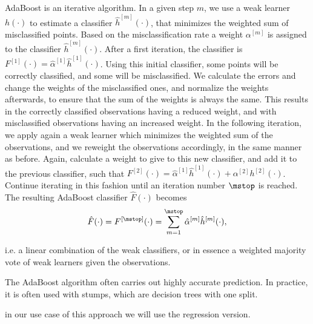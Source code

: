 AdaBoost \cite{adaboost}is an iterative algorithm.
In a given step $m$, we use a weak learner $h(\cdot)$ to estimate a classifier $\hat{h}^{[m]}(\cdot)$, that minimizes the weighted sum of misclassified points.
Based on the misclassification rate a weight $\alpha^{[m]}$ is assigned to the classifier $\hat{h}^{[m]}(\cdot)$.
After a first iteration, the classifier is $F^{[1]}(\cdot)=\hat{\alpha}^{[1]}\hat{h}^{[1]}(\cdot)$.
Using this initial classifier, some points will be correctly classified, and some will be misclassified.
We calculate the errors and change the weights of the misclassified ones, and normalize the weights afterwards, to ensure that the sum of the weights is always the same.
This results in the correctly classified observations having a reduced weight, and with misclassified observations having an increased weight.
In the following iteration, we apply again a weak learner which minimizes the weighted sum of the observations, and we reweight the observations accordingly, in the same manner as before.
Again, calculate a weight to give to this new classifier, and add it to the previous classifier, such that $F^{[2]}(\cdot)=\hat{\alpha}^{[1]}\hat{h}^{[1]}(\cdot)+\alpha^{[2]}h^{[2]}(\cdot)$.
Continue iterating in this fashion until an iteration number $\mstop$ is reached.
The resulting AdaBoost classifier $\hat{F}(\cdot)$ becomes
\begin{equation*}
    \hat{F}(\cdot)=F^{[\mstop]}(\cdot)=\sum_{m=1}^{\mstop}\hat{\alpha}^{[m]}\hat{h}^{[m]}(\cdot),
\end{equation*}

i.e. a linear combination of the weak classifiers, or in essence a weighted majority vote of weak learners given the observations.

The AdaBoost algorithm often carries out highly accurate prediction.
In practice, it is often used with stumps, which are decision trees with one split.

in our use case of this approach we will use the regression version.



